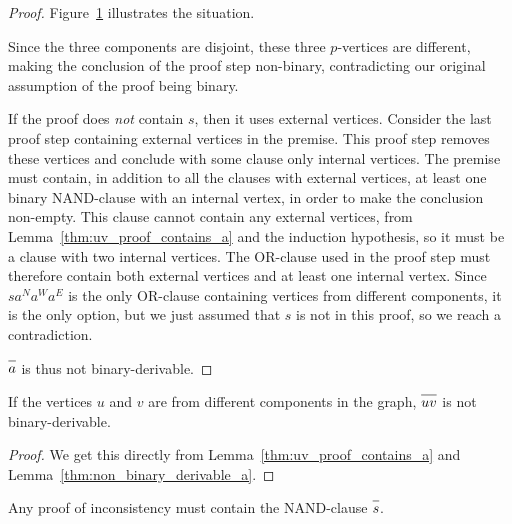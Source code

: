 \begin{proof}
  Figure~\ref{fig:proof_triple_conclusion} illustrates the situation.\par
  \begin{figure}[!h]
    \centering
    \begin{prooftree}
    \end{prooftree}
    \caption{}
    \label{fig:proof_triple_conclusion}
  \end{figure}
  \FloatBarrier
  Since the three components are disjoint, these three $p$-vertices are different, making the conclusion of the proof step non-binary, contradicting our original assumption of the proof being binary.

  If the proof does \textit{not} contain $s$, then it uses external vertices.
  Consider the last proof step containing external vertices in the premise.
  This proof step removes these vertices and conclude with some clause only internal vertices.
  The premise must contain, in addition to all the clauses with external vertices, at least one binary NAND-clause with an internal vertex, in order to make the conclusion non-empty.
  This clause cannot contain any external vertices, from Lemma~\ref{thm:uv_proof_contains_a} and the induction hypothesis, so it must be a clause with two internal vertices.
  The OR-clause used in the proof step must therefore contain both external vertices and at least one internal vertex.
  Since $sa^Na^Wa^E$ is the only OR-clause containing vertices from different components, it is the only option, but we just assumed that $s$ is not in this proof, so we reach a contradiction.

  $\ol{a}$ is thus not binary-derivable.
\end{proof}
\begin{corollary}
  If the vertices $u$ and $v$ are from different components in the graph, $\ol{uv}$ is not binary-derivable.
  \label{thm:non_binary_derivable_uv}
\end{corollary}
\begin{proof}
  We get this directly from Lemma~\ref{thm:uv_proof_contains_a} and Lemma~\ref{thm:non_binary_derivable_a}.
\end{proof}
\begin{lemma}
  Any proof of inconsistency must contain the NAND-clause $\ol{s}$.
  \label{thm:paradox_proof_use_s}
\end{lemma}
